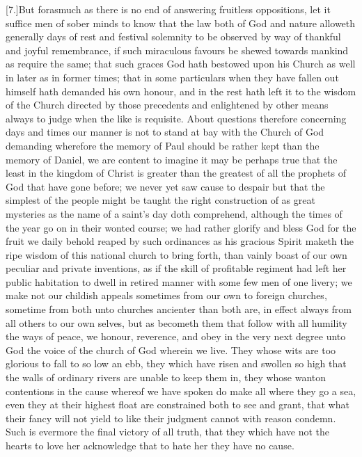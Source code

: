 [7.]But forasmuch as there is no end of answering fruitless oppositions, let it suffice men of sober minds to know that the law both of God and nature alloweth generally days of rest  and festival solemnity to be observed by way of thankful and joyful remembrance,
 if such miraculous favours be shewed towards mankind as require the same; that such graces God hath bestowed upon his Church as well in later as in former times; that in some particulars when they have fallen out himself hath demanded his own honour, and in the rest hath left it to the wisdom of the Church directed by those precedents and enlightened by other means always to judge when the like is requisite. About questions therefore concerning days and times our manner is not to stand at bay with the Church of God demanding wherefore the memory of Paul should be rather kept than the memory of Daniel, we are content to imagine it may be perhaps true that the least in the kingdom of Christ is greater than the greatest of all the prophets of God that have gone before; we never yet saw cause to despair but that the simplest of the people might  be taught the right construction of as great mysteries as the name of a saint’s day doth comprehend, although the times of the year go on in their wonted course; we had rather glorify and bless God for the fruit we daily behold reaped by such ordinances as his gracious Spirit maketh the ripe wisdom of this national church to bring forth, than vainly boast of our own peculiar and private inventions, as if the skill of profitable regiment had left her public habitation to dwell in retired manner with some few men of one livery; we make not our childish appeals sometimes from our own to foreign  churches,
 sometime from both unto churches ancienter than both are, in effect always from all others to our own selves, but as becometh them that follow with all humility the ways of peace, we honour, reverence, and obey in the very next degree unto God the voice of the church of God wherein we live. They whose wits are too glorious to fall to so low an ebb, they which have risen and swollen so high that the walls of ordinary rivers are unable to keep them in, they whose wanton contentions in the cause whereof we have spoken do make all where they go a sea, even they at their highest float are constrained both to see and grant, that what their fancy will not yield to like their judgment cannot with reason condemn. Such is evermore the final victory of all truth, that they which have not the hearts to love her acknowledge that to hate her they have no cause.

